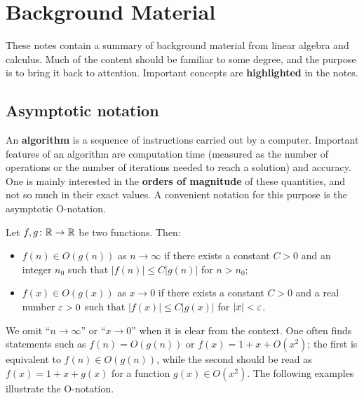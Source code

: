 \documentclass[11pt,a4paper]{memoir}
\begin{document}
\chapter*{Background Material}
These notes contain a summary of background material from linear algebra and calculus. Much of the content should be familiar to some degree, and the purpose is to bring it back to attention. Important concepts are \textbf{highlighted} in the notes.

\section{Asymptotic notation}
An \textbf{algorithm} is a sequence of instructions carried out by a computer. Important features of an algorithm are computation time (measured as the number of operations or the number of iterations needed to reach a solution) and accuracy. 
One is mainly interested in the \textbf{orders of magnitude} of these quantities, and not so much in their exact values. A convenient notation for this purpose is the asymptotic O-notation.

Let $f,g\colon \mathbb{R}\to \mathbb{R}$ be two functions. Then:
\begin{itemize}
 \item $f(n)\in O(g(n))$ as $n\to \infty$ if there exists a constant $C>0$ and an integer $n_0$ such that $|f(n)|\leq C |g(n)|$ for $n>n_0$;
 \item $f(x)\in O(g(x))$ as $x\to 0$ if there exists a constant $C>0$ and a real number $\varepsilon>0$ such that $|f(x)|\leq C|g(x)|$ for $|x|<\varepsilon$.
\end{itemize}

We omit ``$n\to \infty$'' or ``$x\to 0$'' when it is clear from the context. One often finds statements such as $f(n)=O(g(n))$ or $f(x) = 1+x+O(x^2)$; the first is equivalent to $f(n)\in O(g(n))$, while the second should be read as $f(x) = 1+x+g(x)$ for a function $g(x)\in O(x^2)$.
The following examples illustrate the O-notation.
\end{document}
